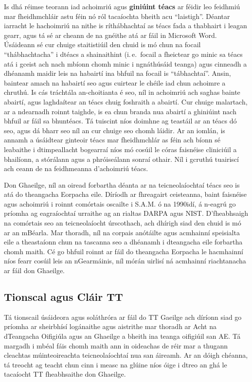\begin{multicols}{2}
Is dhá réimse teorann iad achoimriú agus \textbf{giniúint téacs} ar féidir leo feidhmiú mar fheidhmchláir astu féin nó ról tacaíochta bheith acu ``laistigh''. Déantar iarracht le hachoimriú na nithe is ríthábhachtaí as téacs fada a thabhairt i leagan gearr, agus tá sé ar cheann de na gnéithe atá ar fáil in Microsoft Word.  Úsáideann sé cur chuige staitistiúil den chuid is mó chun na focail ``thábhachtacha'' i dtéacs a shainaithint (i.\,e.~focail a fheictear go minic sa téacs atá i gceist ach nach mbíonn chomh minic i ngnáthúsáid teanga) agus cinneadh a dhéanamh maidir leis na habairtí ina bhfuil na focail is ``tábhachtaí''. Ansin, baintear amach na habairtí seo agus cuirtear le chéile iad chun achoimre a chruthú. Is cás tráchtála an-choitianta é seo, níl in achoimriú ach saghas bainte abairtí, agus laghdaítear an téacs chuig foshraith a abairtí. Cur chuige malartach, ar a ndearnadh roinnt taighde, is ea chun branda nua abairtí a ghiniúint nach bhfuil ar fáil sa bhuntéacs. Tá tuiscint níos doimhne ag teastáil ar an téacs dó seo, agus dá bharr seo níl an cur chuige seo chomh láidir. Ar an iomlán, is annamh a úsáidtear ginteoir téacs mar fheidhmchlár as féin ach bíonn sé leabaithe i dtimpeallacht bogearraí níos mó cosúil le córas faisnéise cliniciúil a bhailíonn, a stórálann agus a phróiseálann sonraí othair.  Níl i gcruthú tuairiscí ach ceann de na feidhmeanna d’achoimriú téacs.  

Don Ghaeilge, níl an oiread forbartha déanta ar na teicneolaíochtaí téacs seo is atá do theangacha Eorpacha eile. Díríodh ar fhreagairt ceisteanna, baint faisnéise agus achoimriú i roinnt comórtais oscailte i S.A.M. ó na 1990idí, á n-eagrú go príomha ag eagraíochtaí urraithe ag an rialtas DARPA agus NIST. D’fheabhsaigh na comórtais seo an teicneolaíocht úrscothach, ach dhírigh siad den chuid is mó ar an mBéarla. Mar thoradh, níl na corpais anótáilte agus acmhainní speisialta eile a theastaíonn chun na tascanna seo a dhéanamh i dteangacha eile forbartha chomh maith. Cé go bhfuil roinnt ar fáil do theangacha Eorpacha le hacmhainní níos fearr cosúil leis an nGearmáinis, níl mórán uirlisí ná acmhainní riachtanacha ar fáil don Ghaeilge.

\subsection{Tionscal agus Cláir TT}

Tá tionscail úsáideora agus soláthróra ar fáil do TT Gaeilge ach díríonn siad go príomha ar sheirbhísí logánaithe agus aistrithe mar thoradh ar Acht na dTeangacha Oifigiúla agus an Ghaeilge a bheith ina teanga oifigiúil san AE. Tá margadh i mbéal fáis chomh maith ann in oideachas de réir mar a thugann cleachtas múinteoireachta teicneolaíochtaí nua san áireamh. Ar an dóigh chéanna, tá treocht ag teacht chun cinn i measc na glúine níos óige i dtreo an ghá le tacaíocht TT fheabhsaithe don Ghaeilge.


\end{multicols}
